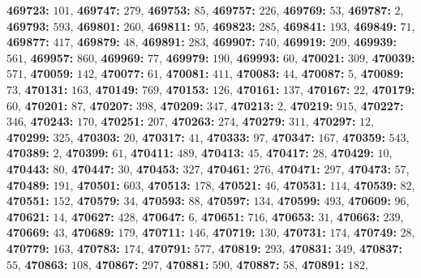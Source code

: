 \textsf{\bfseries 469723:} $101$, \textsf{\bfseries 469747:} $279$, \textsf{\bfseries 469753:} $85$, \textsf{\bfseries 469757:} $226$, \textsf{\bfseries 469769:} $53$, \textsf{\bfseries 469787:} $2$, \textsf{\bfseries 469793:} $593$, \textsf{\bfseries 469801:} $260$, \textsf{\bfseries 469811:} $95$, \textsf{\bfseries 469823:} $285$, \textsf{\bfseries 469841:} $193$, \textsf{\bfseries 469849:} $71$, \textsf{\bfseries 469877:} $417$, \textsf{\bfseries 469879:} $48$, \textsf{\bfseries 469891:} $283$, \textsf{\bfseries 469907:} $740$, \textsf{\bfseries 469919:} $209$, \textsf{\bfseries 469939:} $561$, \textsf{\bfseries 469957:} $860$, \textsf{\bfseries 469969:} $77$, \textsf{\bfseries 469979:} $190$, \textsf{\bfseries 469993:} $60$, \textsf{\bfseries 470021:} $309$, \textsf{\bfseries 470039:} $571$, \textsf{\bfseries 470059:} $142$, \textsf{\bfseries 470077:} $61$, \textsf{\bfseries 470081:} $411$, \textsf{\bfseries 470083:} $44$, \textsf{\bfseries 470087:} $5$, \textsf{\bfseries 470089:} $73$, \textsf{\bfseries 470131:} $163$, \textsf{\bfseries 470149:} $769$, \textsf{\bfseries 470153:} $126$, \textsf{\bfseries 470161:} $137$, \textsf{\bfseries 470167:} $22$, \textsf{\bfseries 470179:} $60$, \textsf{\bfseries 470201:} $87$, \textsf{\bfseries 470207:} $398$, \textsf{\bfseries 470209:} $347$, \textsf{\bfseries 470213:} $2$, \textsf{\bfseries 470219:} $915$, \textsf{\bfseries 470227:} $346$, \textsf{\bfseries 470243:} $170$, \textsf{\bfseries 470251:} $207$, \textsf{\bfseries 470263:} $274$, \textsf{\bfseries 470279:} $311$, \textsf{\bfseries 470297:} $12$, \textsf{\bfseries 470299:} $325$, \textsf{\bfseries 470303:} $20$, \textsf{\bfseries 470317:} $41$, \textsf{\bfseries 470333:} $97$, \textsf{\bfseries 470347:} $167$, \textsf{\bfseries 470359:} $543$, \textsf{\bfseries 470389:} $2$, \textsf{\bfseries 470399:} $61$, \textsf{\bfseries 470411:} $489$, \textsf{\bfseries 470413:} $45$, \textsf{\bfseries 470417:} $28$, \textsf{\bfseries 470429:} $10$, \textsf{\bfseries 470443:} $80$, \textsf{\bfseries 470447:} $30$, \textsf{\bfseries 470453:} $327$, \textsf{\bfseries 470461:} $276$, \textsf{\bfseries 470471:} $297$, \textsf{\bfseries 470473:} $57$, \textsf{\bfseries 470489:} $191$, \textsf{\bfseries 470501:} $603$, \textsf{\bfseries 470513:} $178$, \textsf{\bfseries 470521:} $46$, \textsf{\bfseries 470531:} $114$, \textsf{\bfseries 470539:} $82$, \textsf{\bfseries 470551:} $152$, \textsf{\bfseries 470579:} $34$, \textsf{\bfseries 470593:} $88$, \textsf{\bfseries 470597:} $134$, \textsf{\bfseries 470599:} $493$, \textsf{\bfseries 470609:} $96$, \textsf{\bfseries 470621:} $14$, \textsf{\bfseries 470627:} $428$, \textsf{\bfseries 470647:} $6$, \textsf{\bfseries 470651:} $716$, \textsf{\bfseries 470653:} $31$, \textsf{\bfseries 470663:} $239$, \textsf{\bfseries 470669:} $43$, \textsf{\bfseries 470689:} $179$, \textsf{\bfseries 470711:} $146$, \textsf{\bfseries 470719:} $130$, \textsf{\bfseries 470731:} $174$, \textsf{\bfseries 470749:} $28$, \textsf{\bfseries 470779:} $163$, \textsf{\bfseries 470783:} $174$, \textsf{\bfseries 470791:} $577$, \textsf{\bfseries 470819:} $293$, \textsf{\bfseries 470831:} $349$, \textsf{\bfseries 470837:} $55$, \textsf{\bfseries 470863:} $108$, \textsf{\bfseries 470867:} $297$, \textsf{\bfseries 470881:} $590$, \textsf{\bfseries 470887:} $58$, \textsf{\bfseries 470891:} $182$, 
